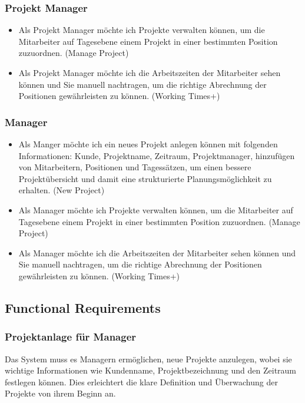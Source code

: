 \documentclass{article}
\begin{document}
\subsubsection{ Projekt Manager}
\begin{itemize}
    \item Als Projekt Manager möchte ich Projekte verwalten können, um die Mitarbeiter
          auf Tagesebene einem Projekt in einer bestimmten Position zuzuordnen. (Manage
          Project)
    \item Als Projekt Manager möchte ich die Arbeitszeiten der Mitarbeiter sehen können
          und Sie manuell nachtragen, um die richtige Abrechnung der Positionen
          gewährleisten zu können. (Working Times+)
\end{itemize}

\subsubsection{ Manager}
\begin{itemize}
    \item Als Manger möchte ich ein neues Projekt anlegen können mit folgenden
          Informationen: Kunde, Projektname, Zeitraum, Projektmanager, hinzufügen von
          Mitarbeitern, Positionen und Tagessätzen, um einen bessere Projektübersicht und
          damit eine strukturierte Planungsmöglichkeit zu erhalten. (New Project)
    \item Als Manager möchte ich Projekte verwalten können, um die Mitarbeiter auf
          Tagesebene einem Projekt in einer bestimmten Position zuzuordnen. (Manage
          Project)
    \item Als Manager möchte ich die Arbeitszeiten der Mitarbeiter sehen können und Sie
          manuell nachtragen, um die richtige Abrechnung der Positionen gewährleisten zu
          können. (Working Times+)
\end{itemize}

\subsection{ Functional Requirements}

\subsubsection{Projektanlage für Manager}
Das System muss es Managern ermöglichen, neue Projekte anzulegen, wobei sie
wichtige Informationen wie Kundenname, Projektbezeichnung und den Zeitraum
festlegen können. Dies erleichtert die klare Definition und Überwachung der
Projekte von ihrem Beginn an.
\end{document}
